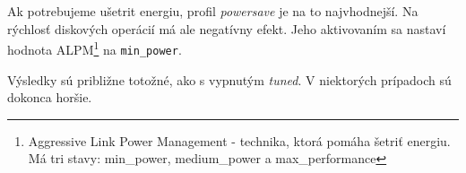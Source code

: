 Ak potrebujeme ušetrit energiu, profil \emph{powersave} je na to najvhodnejší.
Na rýchlosť diskových operácií má ale negatívny efekt. Jeho aktivovaním sa
nastaví hodnota ALPM\footnote{Aggressive Link Power Management - technika,
ktorá pomáha šetriť energiu. Má tri stavy: min\_power, medium\_power a
max\_performance} na \texttt{min\_power}.

Výsledky sú približne totožné, ako s vypnutým \emph{tuned}. V niektorých
prípadoch sú dokonca horšie.
